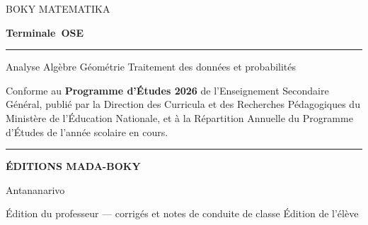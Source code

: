 \cleardoublepage
\thispagestyle{empty}
\begingroup
\raggedright
\vspace*{3.2cm}

{\sffamily\fontsize{11}{14}\selectfont\color{bmtGris} BOKY MATEMATIKA\par}
\vspace{0.5em}
{\sffamily\bfseries\fontsize{40}{44}\selectfont\color{bmtIndigo} Terminale~OSE\par}
\vspace{0.9em}
{\color{bmtRaphia}\rule{4cm}{2.6pt}\par}
\vspace{1.4em}
{\sffamily\fontsize{12}{18}\selectfont
 Analyse \quad Algèbre \quad Géométrie \quad Traitement des données et
 probabilités\par}

\vspace{2.6cm}
{\normalsize
 Conforme au \textbf{Programme d'Études 2026} de l'Enseignement Secondaire
 Général, publié par la Direction des Curricula et des Recherches
 Pédagogiques du Ministère de l'Éducation Nationale, et à la Répartition
 Annuelle du Programme d'Études de l'année scolaire en cours.\par}

\vfill

{\color{bmtIndigo}\rule{1.4cm}{1.6pt}\par}
\vspace{0.5em}
{\sffamily\bfseries\fontsize{13}{17}\selectfont\color{bmtIndigo} ÉDITIONS MADA-BOKY\par}
\vspace{0.3em}
{\sffamily\footnotesize\color{bmtGris} Antananarivo\par}

\vspace{1.2em}
{\sffamily\footnotesize\color{bmtGris}
 \ifbmtprof Édition du professeur — corrigés et notes de conduite de classe
 \else Édition de l'élève\fi\par}
\endgroup
\cleardoublepage

